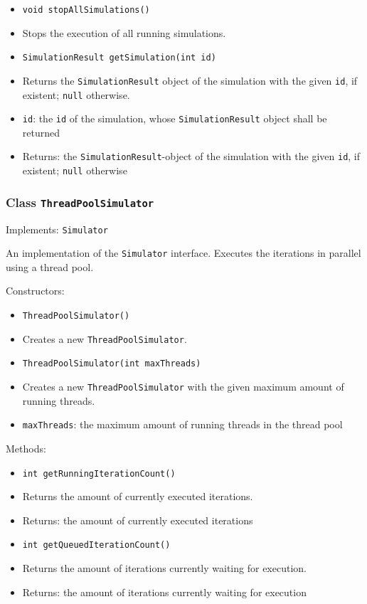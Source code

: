 \documentclass[parskip=full,11pt]{scrartcl}
\begin{document}
\begin{itemize}
	\item \texttt{void stopAllSimulations()}
	\item[] Stops the execution of all running simulations.

	\item \texttt{SimulationResult getSimulation(int id)}
	\item[] Returns the \texttt{SimulationResult} object of the simulation with the given \texttt{id}, if existent; \texttt{null} otherwise.
	\item[] \texttt{id}: the \texttt{id} of the simulation, whose \texttt{SimulationResult} object shall be returned
	\item[] Returns: the \texttt{SimulationResult}-object of the simulation with the given \texttt{id}, if existent; \texttt{null} otherwise
\end{itemize}

\subsubsection{Class \texttt{ThreadPoolSimulator}}
Implements: \texttt{Simulator}

An implementation of the \texttt{Simulator} interface. Executes the iterations in parallel using a thread pool.

Constructors:
\begin{itemize}\itemsep -10pt
\item \texttt{ThreadPoolSimulator()}
\item[] Creates a new \texttt{ThreadPoolSimulator}.

\item \texttt{ThreadPoolSimulator(int maxThreads)}
\item[] Creates a new \texttt{ThreadPoolSimulator} with the given maximum amount of running threads.
\item[] \texttt{maxThreads}: the maximum amount of running threads in the thread pool
\end{itemize}
\newpage
Methods:
\begin{itemize}\itemsep -10pt
\item \texttt{int getRunningIterationCount()}
\item[] Returns the amount of currently executed iterations.
\item[] Returns: the amount of currently executed iterations

\item \texttt{int getQueuedIterationCount()}
\item[] Returns the amount of iterations currently waiting for execution.
\item[] Returns: the amount of iterations currently waiting for execution
\end{itemize}
\end{document}
